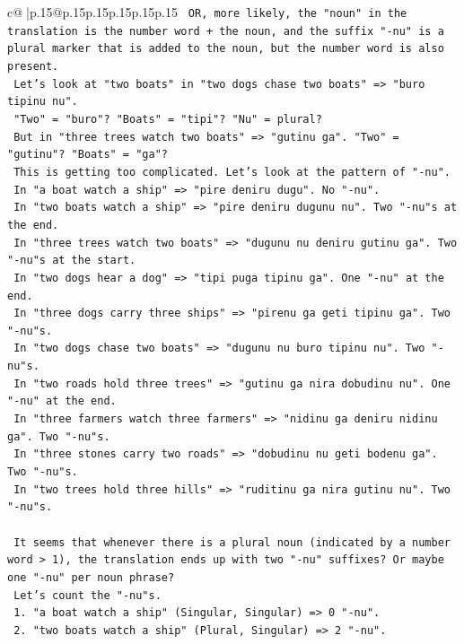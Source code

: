 \documentclass{article}
\begin{document}
{\begin{supertabular}{c@{$\;$}|p{.15\linewidth}@{}p{.15\linewidth}p{.15\linewidth}p{.15\linewidth}p{.15\linewidth}p{.15\linewidth}}
{{{\texttt{   OR, more likely, the "noun" in the translation is the number word + the noun, and the suffix "{-}nu" is a plural marker that is added to the noun, but the number word is also present.} \\
\texttt{   Let's look at "two boats" in "two dogs chase two boats" => "buro tipinu nu".} \\
\texttt{   "Two" = "buro"? "Boats" = "tipi"? "Nu" = plural?} \\
\texttt{   But in "three trees watch two boats" => "gutinu ga". "Two" = "gutinu"? "Boats" = "ga"?} \\
\texttt{   This is getting too complicated. Let's look at the pattern of "{-}nu".} \\
\texttt{   In "a boat watch a ship" => "pire deniru dugu". No "{-}nu".} \\
\texttt{   In "two boats watch a ship" => "pire deniru dugunu nu". Two "{-}nu"s at the end.} \\
\texttt{   In "three trees watch two boats" => "dugunu nu deniru gutinu ga". Two "{-}nu"s at the start.} \\
\texttt{   In "two dogs hear a dog" => "tipi puga tipinu ga". One "{-}nu" at the end.} \\
\texttt{   In "three dogs carry three ships" => "pirenu ga geti tipinu ga". Two "{-}nu"s.} \\
\texttt{   In "two dogs chase two boats" => "dugunu nu buro tipinu nu". Two "{-}nu"s.} \\
\texttt{   In "two roads hold three trees" => "gutinu ga nira dobudinu nu". One "{-}nu" at the end.} \\
\texttt{   In "three farmers watch three farmers" => "nidinu ga deniru nidinu ga". Two "{-}nu"s.} \\
\texttt{   In "three stones carry two roads" => "dobudinu nu geti bodenu ga". Two "{-}nu"s.} \\
\texttt{   In "two trees hold three hills" => "ruditinu ga nira gutinu nu". Two "{-}nu"s.} \\
\\ 
\texttt{   It seems that whenever there is a plural noun (indicated by a number word > 1), the translation ends up with two "{-}nu" suffixes? Or maybe one "{-}nu" per noun phrase?} \\
\texttt{   Let's count the "{-}nu"s.} \\
\texttt{   1. "a boat watch a ship" (Singular, Singular) => 0 "{-}nu".} \\
\texttt{   2. "two boats watch a ship" (Plural, Singular) => 2 "{-}nu".} \\
}}}
\end{supertabular}}
\end{document}
